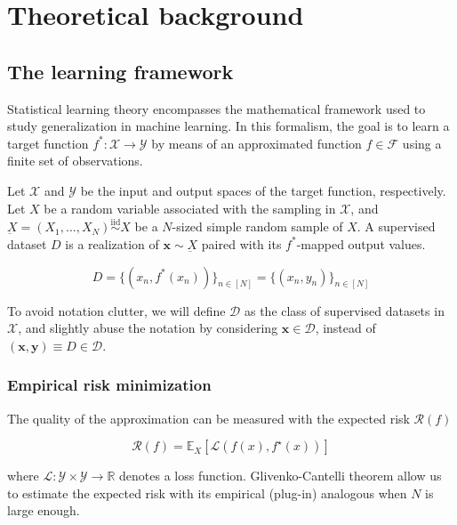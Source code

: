 \chapter{Theoretical background }\label{sec:theory}

\section{The learning framework}

Statistical learning theory encompasses the mathematical framework used to
study generalization in machine learning. In this formalism, the goal
is to learn a target function $f^*: \mathcal{X} \to \mathcal{Y}$ by means of an approximated
function $f \in \mathcal{F}$ using a finite set of observations. 

\begin{definition}\label{def:dataset}
    Let $\mathcal{X}$ and $\mathcal{Y}$ be
    the input and output spaces of the target function, respectively. Let $X$ be a random variable associated
    with the sampling in $\mathcal{X}$, and $\underbar{X} = (X_1, ..., X_N) \overset{\text{iid}}{\sim} X$ be a $N$-sized simple
    random sample of $X$. A supervised dataset $D$ is a realization of $\bm{x} \sim \underbar{X}$ paired with its $f^*$-mapped output values.

    $$
    D = \{(x_n, f^*(x_n))\}_{n \in [N]} = \{(x_n, y_n)\}_{n \in [N]}
    $$

    To avoid notation clutter, we will define $\mathcal{D}$ as the class
    of supervised datasets in $\mathcal{X}$, and slightly abuse the notation
    by considering $\bm{x} \in \mathcal{D}$, instead of 
    $(\bm{x}, \bm{y}) \equiv D \in \mathcal{D}$.
\end{definition}

\subsection{Empirical risk minimization}\label{sec:erm}

The quality of the approximation can be measured with the expected risk $\mathcal{R}(f)$

$$
\mathcal{R}(f)=\mathbb{E}_{X} [\mathcal{L}(f(x),f^\star(x))]
$$

where $\mathcal{L}: \mathcal{Y} \times \mathcal{Y} \to \mathbb{R}$ denotes a loss function. Glivenko-Cantelli theorem allow us to
estimate the expected risk with its empirical (plug-in) analogous when $N$ is large enough.


